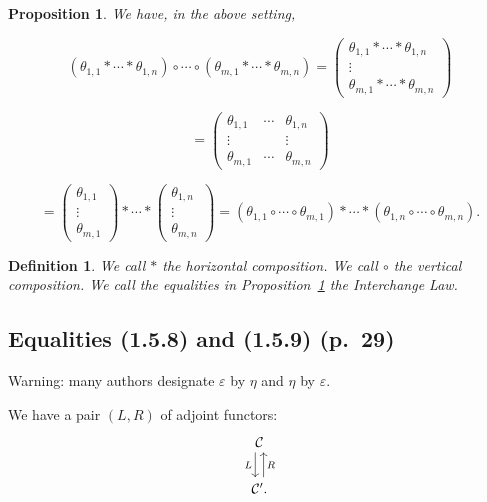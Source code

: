 \documentclass[12pt]{article}%
\newtheorem{prop}[thm]{Proposition}
\newtheorem{df}[thm]{Definition}%
\theoremstyle{remark}
\theoremstyle{definition}
\newcommand{\C}{\mathcal C}
\begin{document}
\begin{prop}\label{pil1}
We have, in the above setting,

$$
(\theta_{1,1}*\cdots*\theta_{1,n})\circ\cdots\circ(\theta_{m,1}*\cdots*\theta_{m,n})
=\begin{pmatrix}
\theta_{1,1}*\cdots*\theta_{1,n}\\
\vdots\\ 
\theta_{m,1}*\cdots*\theta_{m,n}
\end{pmatrix}
$$ 

$$
=\begin{pmatrix}
\theta_{1,1}&\cdots&\theta_{1,n}\\
\vdots&&\vdots\\ 
\theta_{m,1}&\cdots&\theta_{m,n}
\end{pmatrix}
$$

$$
=\begin{pmatrix}\theta_{1,1}\\ \vdots\\ \theta_{m,1}\end{pmatrix}*\cdots*
\begin{pmatrix}\theta_{1,n}\\ \vdots\\ \theta_{m,n}\end{pmatrix}
=(\theta_{1,1}\circ\cdots\circ\theta_{m,1})*\cdots*(\theta_{1,n}\circ\cdots\circ\theta_{m,n}).
$$
\end{prop}

\begin{df}\label{dil1} 
We call $*$ the {\em horizontal composition}.  We call $\circ$ the {\em vertical composition}.  We call the equalities in Proposition~\ref{pil1} the {\em Interchange Law}. 
\end{df}


\subsection{Equalities (1.5.8) and (1.5.9) (p.~29)}

Warning: many authors designate $\varepsilon$ by $\eta$ and $\eta$ by $\varepsilon$. 

We have a pair $(L,R)$ of adjoint functors: 
$$
\begin{tikzcd}
\C\ar[xshift=-.7ex]{d}[swap]{L}\\ 
\C'.\ar[xshift=.7ex]{u}[swap]{R}
\end{tikzcd}
$$
\end{document}
